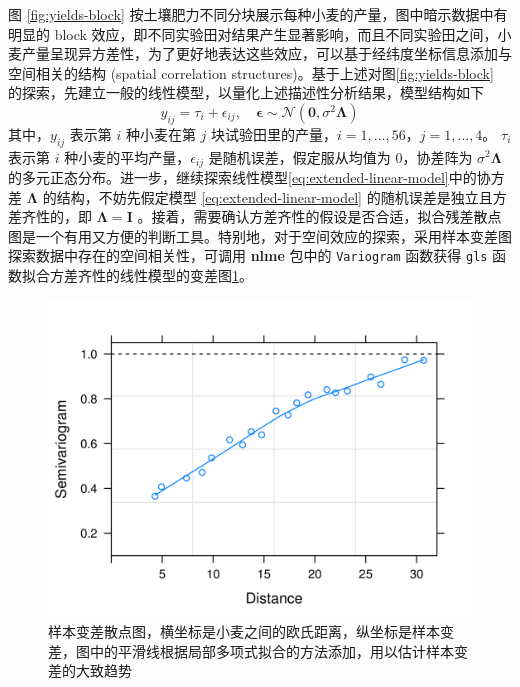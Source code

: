 \documentclass[12pt,a4paper,UTF8,twoside]{book}
\theoremstyle{definition}
\theoremstyle{definition}
\theoremstyle{definition}
\theoremstyle{remark}
\begin{document}
图 \ref{fig:yields-block}
按土壤肥力不同分块展示每种小麦的产量，图中暗示数据中有明显的 block
效应，即不同实验田对结果产生显著影响，而且不同实验田之间，小麦产量呈现异方差性，为了更好地表达这些效应，可以基于经纬度坐标信息添加与空间相关的结构
(spatial correlation structures)。基于上述对图\ref{fig:yields-block}
的探索，先建立一般的线性模型，以量化上述描述性分析结果，模型结构如下
\begin{equation}
y_{ij} = \tau_i + \epsilon_{ij}, \quad \boldsymbol{\epsilon} \sim \mathcal{N}(\mathbf{0},\sigma^2 \boldsymbol{\Lambda}) \label{eq:extended-linear-model}
\end{equation} \noindent 其中，\(y_{ij}\) 表示第 \(i\) 种小麦在第 \(j\)
块试验田里的产量，\(i = 1,\ldots,56\)，\(j = 1,\ldots,4\)。 \(\tau_i\)
表示第 \(i\) 种小麦的平均产量，\(\epsilon_{ij}\)
是随机误差，假定服从均值为 0，协差阵为 \(\sigma^2 \boldsymbol{\Lambda}\)
的多元正态分布。进一步，继续探索线性模型\eqref{eq:extended-linear-model}中的协方差
\(\boldsymbol{\Lambda}\) 的结构，不妨先假定模型
\eqref{eq:extended-linear-model} 的随机误差是独立且方差齐性的，即
\(\boldsymbol{\Lambda} = \boldsymbol{I}\)
。接着，需要确认方差齐性的假设是否合适，拟合残差散点图是一个有用又方便的判断工具。特别地，对于空间效应的探索，采用样本变差图探索数据中存在的空间相关性，可调用
\textbf{nlme} 包中的 \texttt{Variogram} 函数获得 \texttt{gls}
函数拟合方差齐性的线性模型的变差图\ref{fig:yields-variogram}。

\begin{figure}

{\centering \includegraphics[width=0.7\linewidth]{figures/Yields-Variogram} 

}

\caption{样本变差散点图，横坐标是小麦之间的欧氏距离，纵坐标是样本变差，图中的平滑线根据局部多项式拟合的方法添加，用以估计样本变差的大致趋势}\label{fig:yields-variogram}
\end{figure}
\end{document}
